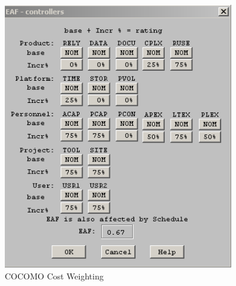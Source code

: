 \begin{figure}[H]
\begin{center}
\includegraphics[width=10cm]{coco.png}
\end{center}
\caption{COCOMO Cost Weighting }
\label{fig:letter}
\end{figure}

